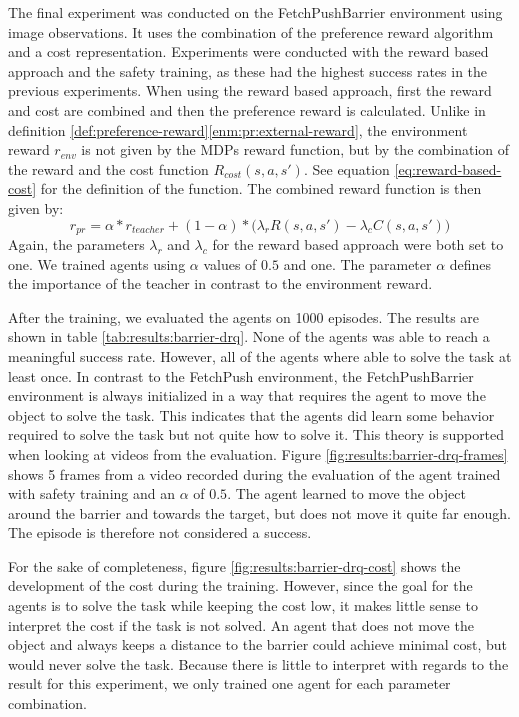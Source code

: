 The final experiment was conducted on the FetchPushBarrier environment using image observations. It uses the combination of the preference reward algorithm and a cost representation. Experiments were conducted with the reward based approach and the safety training, as these had the highest success rates in the previous experiments. When using the reward based approach, first the reward and cost are combined and then the preference reward is calculated. Unlike in definition \ref{def:preference-reward}\ref{enm:pr:external-reward}, the environment reward $r_{env}$ is not given by the MDPs reward function, but by the combination of the reward and the cost function $R_{cost}(s,a,s')$. See equation \ref{eq:reward-based-cost} for the definition of the function. The combined reward function is then given by:
\[
r_{pr} = \alpha * r_{teacher} + (1-\alpha) * \big(\lambda_r R(s,a,s') - \lambda_c C(s,a,s')\big)
\]
Again, the parameters $\lambda_r$ and $\lambda_c$ for the reward based approach were both set to one. We trained agents using $\alpha$ values of $0.5$ and one. The parameter $\alpha$ defines the importance of the teacher in contrast to the environment reward.

After the training, we evaluated the agents on 1000 episodes. The results are shown in table \ref{tab:results:barrier-drq}. None of the agents was able to reach a meaningful success rate. However, all of the agents where able to solve the task at least once. In contrast to the FetchPush environment, the FetchPushBarrier environment is always initialized in a way that requires the agent to move the object to solve the task. This indicates that the agents did learn some behavior required to solve the task but not quite how to solve it. This theory is supported when looking at videos from the evaluation. Figure \ref{fig:results:barrier-drq-frames} shows 5 frames from a video recorded during the evaluation of the agent trained with safety training and an $\alpha$ of $0.5$. The agent learned to move the object around the barrier and towards the target, but does not move it quite far enough. The episode is therefore not considered a success.

For the sake of completeness, figure \ref{fig:results:barrier-drq-cost} shows the development of the cost during the training. However, since the goal for the agents is to solve the task while keeping the cost low, it makes little sense to interpret the cost if the task is not solved. An agent that does not move the object and always keeps a distance to the barrier could achieve minimal cost, but would never solve the task. Because there is little to interpret with regards to the result for this experiment, we only trained one agent for each parameter combination.

